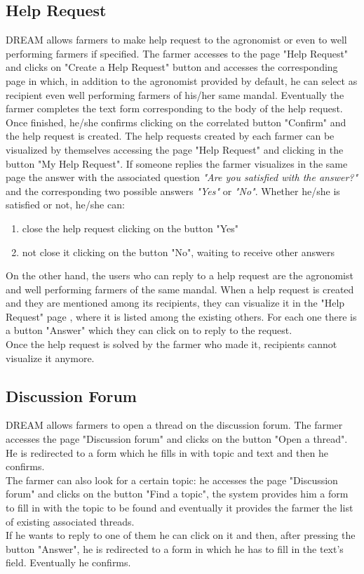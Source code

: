 \subsection{Help Request}
DREAM allows farmers to make help request to the agronomist or even to well performing farmers if specified. The farmer accesses to the page "Help Request" and clicks on "Create a Help Request" button and accesses the corresponding page in which, in addition to the agronomist provided by default, he can select as recipient even well performing farmers of his/her same mandal. Eventually the farmer completes the text form corresponding to the body of the help request. Once finished, he/she confirms clicking on the correlated button "Confirm" and the help request is created. The help requests created by each farmer can be visualized by themselves accessing the page "Help Request" and clicking in the button "My Help Request". If someone replies the farmer visualizes in the same page the answer with the associated question \textit{"Are you satisfied with the answer?"} and the corresponding two possible answers \textit{"Yes"} or \textit{"No"}. Whether he/she is satisfied or not, he/she can:
\begin{enumerate}
    \item close the help request clicking on the button "Yes"
    \item not close it clicking on the button "No", waiting to receive other answers
\end{enumerate}
On the other hand, the users who can reply to a help request are the agronomist and well performing farmers of the same mandal. When a help request is created and they are mentioned among its recipients, they can visualize it in the "Help Request" page , where it is listed among the existing others. For each one there is a button "Answer" which they can click on to reply to the request.\\
Once the help request is solved by the farmer who made it, recipients cannot visualize it anymore. 

\subsection{Discussion Forum}
DREAM allows farmers to open a thread on the discussion forum. The farmer accesses the page "Discussion forum" and clicks on the button "Open a thread". He is redirected to a form which he fills in with topic and text and then he confirms. \\
The farmer can also look for a certain topic: he accesses the page "Discussion forum" and clicks on the button "Find a topic", the system provides him a form to fill in with the topic to be found and eventually it provides the farmer the list of existing associated threads.\\
If he wants to reply to one of them he can click on it and then, after pressing the button "Answer", he is redirected to a form in which he has to fill in the text's field. Eventually he confirms.

